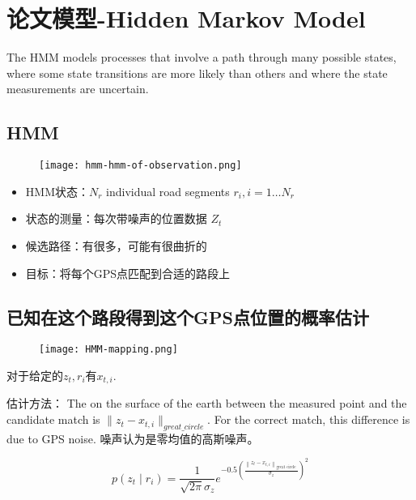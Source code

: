 \section{论文模型-Hidden Markov Model}

The HMM models processes that involve a path through many
possible states, where some state transitions are more likely than
others and where the state measurements are uncertain.

\subsection{HMM}

\begin{figure}[h]
    \centering
    \texttt{[image: hmm-hmm-of-observation.png]}
\end{figure}

\begin{itemize}
    \item HMM状态：$ N_{r} $ individual  road  segments $ r_{i},  i=1 \ldots N_{r} $
    \item 状态的测量：每次带噪声的位置数据 $ Z_{t} $
    \item 候选路径：有很多，可能有很曲折的
    \item 目标：将每个GPS点匹配到合适的路段上
\end{itemize}

\subsection{已知在这个路段得到这个GPS点位置的概率估计}

\begin{figure}[h]
    \centering
    \texttt{[image: HMM-mapping.png]}
\end{figure}

对于给定的$z_{t},r_{i} $有$ x_{t, i}$. 

估计方法：
The  on the surface of the earth between the measured point and the candidate match is $ \| z_{t}- x_{t, i} \|_{great\_circle}$. For the correct match, this difference is due to GPS noise. 噪声认为是零均值的高斯噪声。 

\begin{equation} p\left(z_{t} \mid r_{i}\right)=\frac{1}{\sqrt{2 \pi} \sigma_{z}} e^{-0.5\left(\frac{\left\|z_{t}-x_{t, i}\right\|_{\text {great circle }}}{\sigma_{z}}\right)^{2}} \end{equation}

